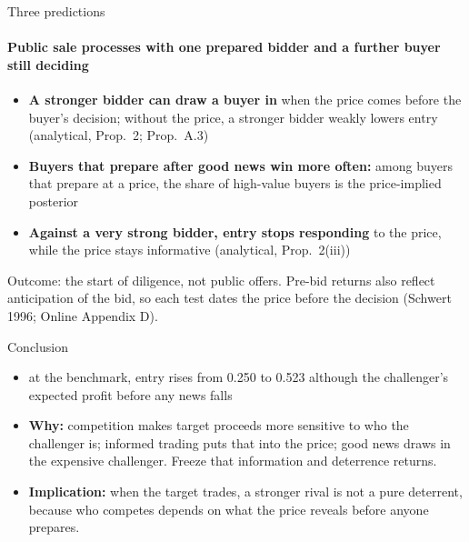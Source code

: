 \documentclass[10pt,aspectratio=169]{beamer}
\newcommand{\Status}[1]{{\color{cGrayText}\scriptsize #1}}
\newcommand{\GrayLine}[1]{\par{\color{cGrayText}\footnotesize #1\par}}
\begin{document}
\begin{frame}[label=F15]{Three predictions}
\framesubtitle{Public sale processes with one prepared bidder and a further buyer still deciding}
\begin{itemize}\setlength{\itemsep}{8pt}
\item \textbf{A stronger bidder can draw a buyer in} when the price comes before the buyer's decision; without the price, a stronger bidder weakly lowers entry \Status{(analytical, Prop.~2; Prop.~A.3)}
\item \textbf{Buyers that prepare after good news win more often:} among buyers that prepare at a price, the share of high-value buyers is the price-implied posterior
\item \textbf{Against a very strong bidder, entry stops responding} to the price, while the price stays informative \Status{(analytical, Prop.~2(iii))}
\end{itemize}
\medskip
\GrayLine{Outcome: the start of diligence, not public offers. Pre-bid returns also reflect anticipation of the bid, so each test dates the price before the decision (Schwert 1996; Online Appendix D).}
\end{frame}

\begin{frame}[label=F16]{Conclusion}
\begin{itemize}\setlength{\itemsep}{20pt}
\item {} at the benchmark, entry rises from 0.250 %
to 0.523 %
although the challenger's expected profit before any news falls
\item \textbf{Why:} competition makes target proceeds more sensitive to who the challenger is; informed trading puts that into the price; good news draws in the expensive challenger. Freeze that information and deterrence returns.
\item \textbf{Implication:} when the target trades, a stronger rival is not a pure deterrent, because who competes depends on what the price reveals before anyone prepares.
\end{itemize}
\end{frame}
\end{document}
